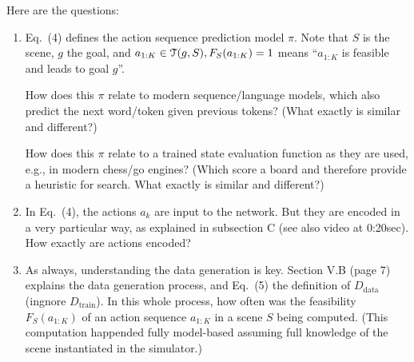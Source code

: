 Here are the questions:
\begin{enumerate}
\item Eq.~(4) defines the action sequence prediction model $\pi$. Note
that $S$ is the scene, $g$ the goal, and $a_{1:K}\in{\cal T}(g, S),
F_S(a_{1:K})=1$ means ``$a_{1:K}$ is feasible and leads to goal $g$''.

How does this $\pi$ relate to modern sequence/language models, which
also predict the next word/token given previous tokens? (What exactly
is similar and different?)

How does this $\pi$ relate to a trained state evaluation function as
they are used, e.g., in modern chess/go engines? (Which score a board and
therefore provide a heuristic for search. What exactly is similar and different?)


\item In Eq.~(4), the actions $a_k$ are input to the network. But they
are encoded in a very particular way, as explained in subsection C
(see also video at 0:20sec). How exactly are actions encoded?


\item As always, understanding the data generation is key. Section V.B
(page 7) explains the data generation process, and Eq.~(5) the
definition of $D_\text{data}$ (ingnore $D_\text{train}$). In this
whole process, how often was the feasibility $F_S(a_{1:K})$ of an
action sequence $a_{1:K}$ in a scene $S$ being computed. (This
computation happended fully model-based assuming full knowledge of the
scene instantiated in the simulator.)


\end{enumerate}




